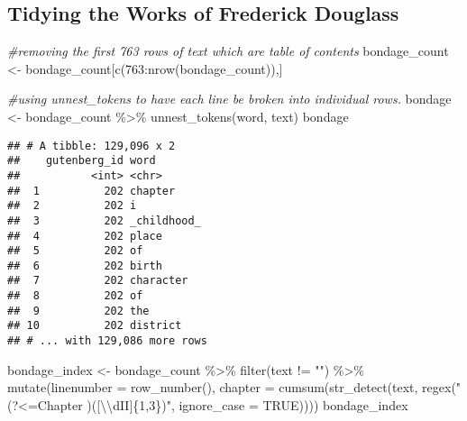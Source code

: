 \documentclass[
]{article}
\newenvironment{Shaded}{\begin{snugshade}}{\end{snugshade}}
\newcommand{\AttributeTok}[1]{\textcolor[rgb]{0.77,0.63,0.00}{#1}}
\newcommand{\CommentTok}[1]{\textcolor[rgb]{0.56,0.35,0.01}{\textit{#1}}}
\newcommand{\ConstantTok}[1]{\textcolor[rgb]{0.00,0.00,0.00}{#1}}
\newcommand{\DecValTok}[1]{\textcolor[rgb]{0.00,0.00,0.81}{#1}}
\newcommand{\FunctionTok}[1]{\textcolor[rgb]{0.00,0.00,0.00}{#1}}
\newcommand{\NormalTok}[1]{#1}
\newcommand{\OtherTok}[1]{\textcolor[rgb]{0.56,0.35,0.01}{#1}}
\newcommand{\SpecialCharTok}[1]{\textcolor[rgb]{0.00,0.00,0.00}{#1}}
\newcommand{\StringTok}[1]{\textcolor[rgb]{0.31,0.60,0.02}{#1}}
\begin{document}
\hypertarget{tidying-the-works-of-frederick-douglass}{%
\subsection{Tidying the Works of Frederick
Douglass}\label{tidying-the-works-of-frederick-douglass}}

\begin{Shaded}
\begin{Highlighting}[]
\CommentTok{\#removing the first 763 rows of text which are table of contents}
\NormalTok{bondage\_count }\OtherTok{\textless{}{-}}\NormalTok{ bondage\_count[}\FunctionTok{c}\NormalTok{(}\DecValTok{763}\SpecialCharTok{:}\FunctionTok{nrow}\NormalTok{(bondage\_count)),]}

\CommentTok{\#using unnest\_tokens to have each line be broken into individual rows. }
\NormalTok{bondage }\OtherTok{\textless{}{-}}\NormalTok{ bondage\_count }\SpecialCharTok{\%\textgreater{}\%} \FunctionTok{unnest\_tokens}\NormalTok{(word, text)}
\NormalTok{bondage}
\end{Highlighting}
\end{Shaded}

\begin{verbatim}
## # A tibble: 129,096 x 2
##    gutenberg_id word       
##           <int> <chr>      
##  1          202 chapter    
##  2          202 i          
##  3          202 _childhood_
##  4          202 place      
##  5          202 of         
##  6          202 birth      
##  7          202 character  
##  8          202 of         
##  9          202 the        
## 10          202 district   
## # ... with 129,086 more rows
\end{verbatim}

\begin{Shaded}
\begin{Highlighting}[]
\NormalTok{bondage\_index }\OtherTok{\textless{}{-}}\NormalTok{ bondage\_count }\SpecialCharTok{\%\textgreater{}\%} 
  \FunctionTok{filter}\NormalTok{(text }\SpecialCharTok{!=} \StringTok{""}\NormalTok{) }\SpecialCharTok{\%\textgreater{}\%}
  \FunctionTok{mutate}\NormalTok{(}\AttributeTok{linenumber =} \FunctionTok{row\_number}\NormalTok{(),}
         \AttributeTok{chapter =} \FunctionTok{cumsum}\NormalTok{(}\FunctionTok{str\_detect}\NormalTok{(text, }\FunctionTok{regex}\NormalTok{(}\StringTok{"(?\textless{}=Chapter )([}\SpecialCharTok{\textbackslash{}\textbackslash{}}\StringTok{dII]\{1,3\})"}\NormalTok{, }\AttributeTok{ignore\_case =}  \ConstantTok{TRUE}\NormalTok{)))) }
\NormalTok{bondage\_index}
\end{Highlighting}
\end{Shaded}
\end{document}
